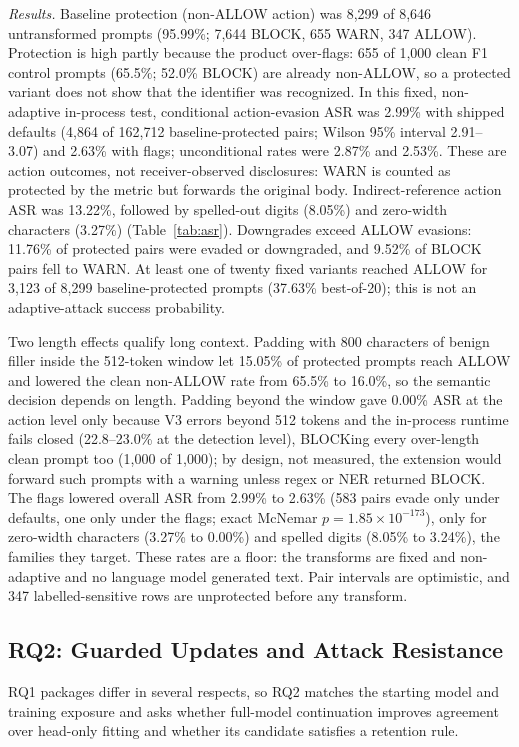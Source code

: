 \documentclass[sigconf]{acmart}
\theoremstyle{acmdefinition}\newtheorem{property}{Property}
\begin{document}
\textit{Results.} Baseline protection (non-ALLOW action) was 8,299 of 8,646 untransformed prompts (95.99\%; 7,644 BLOCK, 655 WARN, 347 ALLOW). Protection is high partly because the product over-flags: 655 of 1,000 clean F1 control prompts (65.5\%; 52.0\% BLOCK) are already non-ALLOW, so a protected variant does not show that the identifier was recognized. In this fixed, non-adaptive in-process test, conditional action-evasion ASR was 2.99\% with shipped defaults (4,864 of 162,712 baseline-protected pairs; Wilson 95\% interval 2.91--3.07) and 2.63\% with flags; unconditional rates were 2.87\% and 2.53\%. These are action outcomes, not receiver-observed disclosures: WARN is counted as protected by the metric but forwards the original body. Indirect-reference action ASR was 13.22\%, followed by spelled-out digits (8.05\%) and zero-width characters (3.27\%) (Table~\ref{tab:asr}). Downgrades exceed ALLOW evasions: 11.76\% of protected pairs were evaded or downgraded, and 9.52\% of BLOCK pairs fell to WARN. At least one of twenty fixed variants reached ALLOW for 3,123 of 8,299 baseline-protected prompts (37.63\% best-of-20); this is not an adaptive-attack success probability.

Two length effects qualify long context. Padding with 800 characters of benign filler inside the 512-token window let 15.05\% of protected prompts reach ALLOW and lowered the clean non-ALLOW rate from 65.5\% to 16.0\%, so the semantic decision depends on length. Padding beyond the window gave 0.00\% ASR at the action level only because V3 errors beyond 512 tokens and the in-process runtime fails closed (22.8--23.0\% at the detection level), BLOCKing every over-length clean prompt too (1,000 of 1,000); by design, not measured, the extension would forward such prompts with a warning unless regex or NER returned BLOCK. The flags lowered overall ASR from 2.99\% to 2.63\% (583 pairs evade only under defaults, one only under the flags; exact McNemar $p=1.85\times10^{-173}$), only for zero-width characters (3.27\% to 0.00\%) and spelled digits (8.05\% to 3.24\%), the families they target. These rates are a floor: the transforms are fixed and non-adaptive and no language model generated text. Pair intervals are optimistic, and 347 labelled-sensitive rows are unprotected before any transform.

\subsection{RQ2: Guarded Updates and Attack Resistance}
\label{sec:adaptation_results}
RQ1 packages differ in several respects, so RQ2 matches the starting model and training exposure and asks whether full-model continuation improves agreement over head-only fitting and whether its candidate satisfies a retention rule.
\end{document}
